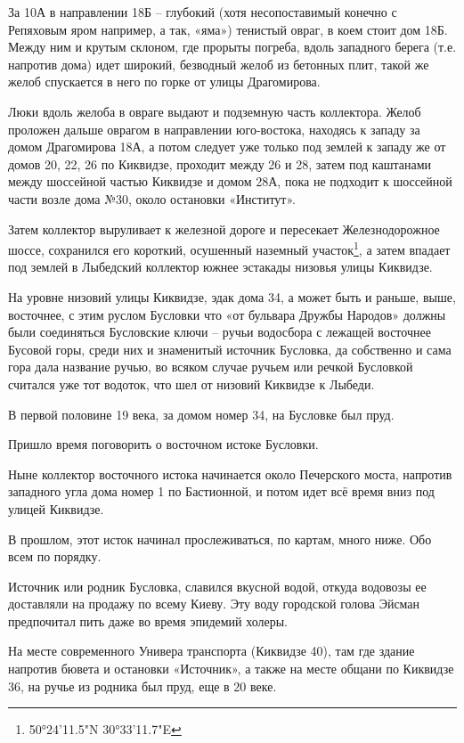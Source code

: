 За 10А в направлении 18Б – глубокий (хотя несопоставимый конечно с Репяховым яром например, а так, «яма») тенистый овраг, в коем стоит дом 18Б. Между ним и крутым склоном, где прорыты погреба, вдоль западного берега (т.е. напротив дома) идет широкий, безводный желоб из бетонных плит, такой же желоб спускается в него по горке от улицы Драгомирова.  

Люки вдоль желоба в овраге выдают и подземную часть коллектора. Желоб проложен дальше оврагом в направлении юго-востока, находясь к западу за домом Драгомирова 18А, а потом следует уже только под землей к западу же от домов 20, 22, 26 по Киквидзе, проходит между 26 и 28, затем под каштанами между шоссейной частью Киквидзе и домом 28А, пока не подходит к шоссейной части возле дома №30, около остановки «Институт».

Затем коллектор выруливает к железной дороге и пересекает Железнодорожное шоссе, сохранился его короткий, осушенный наземный участок\footnote{50°24'11.5"N 30°33'11.7"E}, а затем впадает под землей в Лыбедский коллектор южнее эстакады низовья улицы Киквидзе.

На уровне низовий улицы Киквидзе, эдак дома 34, а может быть и раньше, выше, восточнее, с этим руслом Бусловки что «от бульвара Дружбы Народов» должны были соединяться Бусловские ключи – ручьи водосбора с лежащей восточнее Бусовой горы, среди них и знаменитый источник Бусловка, да собственно и сама гора дала название ручью, во всяком случае ручьем или речкой Бусловкой считался уже тот водоток, что шел от низовий Киквидзе к Лыбеди.

В первой половине 19 века, за домом номер 34, на Бусловке был пруд.

Пришло время поговорить о восточном истоке Бусловки.

Ныне коллектор восточного истока начинается около Печерского моста, напротив западного угла дома номер 1 по Бастионной, и потом идет всё время вниз под улицей Киквидзе. 

В прошлом, этот исток начинал прослеживаться, по картам, много ниже. Обо всем по порядку.

Источник или родник Бусловка, славился вкусной водой, откуда водовозы ее доставляли на продажу по всему Киеву. Эту воду городской голова Эйсман предпочитал пить даже во время эпидемий холеры.

На месте современного Универа транспорта (Киквидзе 40), там где здание напротив бювета и остановки «Источник», а также на месте общани по Киквидзе 36,  на ручье из родника был пруд, еще в 20 веке.  

